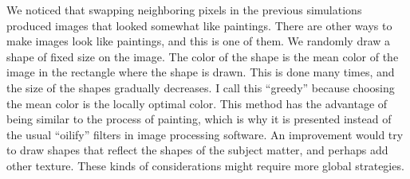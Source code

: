 \documentclass[../notebook.tex]{subfiles}
\begin{document}

We noticed that swapping neighboring pixels in the previous simulations produced
images that looked somewhat like paintings. There are other ways to make images
look like paintings, and this is one of them. We randomly draw a shape of fixed
size on the image. The color of the shape is the mean color of the image in the
rectangle where the shape is drawn. This is done many times, and the size of the
shapes gradually decreases. I call this ``greedy'' because choosing the mean
color is the locally optimal color. This method has the advantage of being
similar to the process of painting, which is why it is presented instead of the
usual ``oilify'' filters in image processing software. An improvement would try
to draw shapes that reflect the shapes of the subject matter, and perhaps add
other texture. These kinds of considerations might require more global
strategies.


\end{document}
